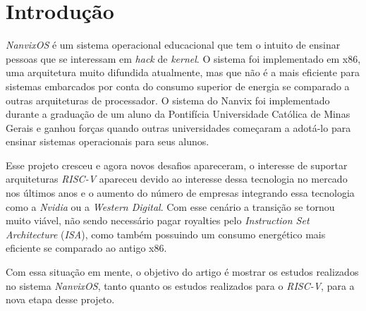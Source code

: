 \section{Introdução}

\emph{NanvixOS} é um sistema operacional educacional que tem o intuito de ensinar pessoas que se interessam em \emph{hack} de \emph{kernel}. 
O sistema foi implementado em x86, uma arquitetura muito difundida atualmente, mas que não é a mais eficiente para sistemas 
embarcados por conta do consumo superior de energia se comparado a outras arquiteturas de processador. O sistema do Nanvix foi 
implementado durante a graduação de um aluno da Pontifícia Universidade Católica de Minas Gerais e ganhou forças quando outras 
universidades começaram a adotá-lo para ensinar sistemas operacionais para seus alunos.

Esse projeto cresceu e agora novos desafios apareceram, o interesse de suportar arquiteturas \emph{RISC-V} apareceu devido ao 
interesse dessa tecnologia no mercado nos últimos anos e o aumento do número de empresas integrando essa tecnologia como a \emph{Nvidia} 
ou a \emph{Western Digital}. Com esse cenário a transição se tornou muito viável, não sendo necessário pagar royalties pelo \emph{Instruction Set Architecture}
(\emph{ISA}), como também possuindo um consumo energético mais eficiente se comparado ao antigo x86.  

Com essa situação em mente, o objetivo do artigo é mostrar os estudos realizados no sistema \emph{NanvixOS}, tanto quanto os 
estudos realizados para o \emph{RISC-V}, para a nova etapa desse projeto.
